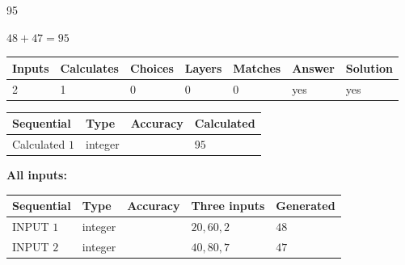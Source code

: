 \documentclass[12pt]{article}
\begin{document}
 
 
\noindent{}
 
 

95
 
 
\noindent{}
 
 

 
 
 
\noindent{}
 
 

$ %
48 +  %
47=   %
95$
 
 
\noindent{}
 
 

 
   
   
   
   
\noindent\begin{tabular}{|l|l|l|l|l|l|l|}
 \hline
Inputs & Calculates & Choices & Layers & Matches & Answer & Solution \\ \hline
 2  & 
 1  & 
 0
  & 
 0  & 
 0  & 
  yes & 
  yes 
  \\ \hline
 \end{tabular}
   
   
   
   
\noindent{}
   
   
  
  
\noindent\begin{tabular}{|l|l|l|l|}
\hline
 Sequential & Type & Accuracy & Calculated \\ 
\hline
 
 
  Calculated $  1 $ & integer &  & 
  $ 95 $ 
 \\  \hline  
 \end{tabular}
   
   
   
   
\noindent\vspace{0.1in}\hspace{-0.08in} {\textbf{\Large{All inputs: }}}
   
   
  
  
\noindent\begin{tabular}{|l|l|l|l|l|}
\hline
 Sequential & Type & Accuracy & Three inputs & Generated \\ 
\hline
 
 
  INPUT $  1 $ & integer &  & $
 20
 , 
 60
 , 
 2
 $ & $ 48 $ 
 \\  \hline  
 
 
  INPUT $  2 $ & integer &  & $
 40
 , 
 80
 , 
 7
 $ & $ 47 $ 
 \\  \hline  
 \end{tabular}
   
\end{document}
